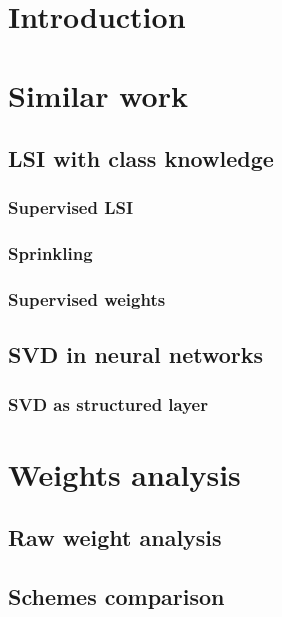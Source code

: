 \chapter*{Introduction}


{}


\chapter{Similar work}
    \section{LSI with class knowledge}
        \subsection{Supervised LSI}
            \cite{sun2004supervised} %

        \subsection{Sprinkling}
            \cite{chakraborti2007supervised} %
        
        \subsection{Supervised weights} \label{sec:supervised:weights}
            \cite{wu2017balancing} %
            \cite{ji2013discriminative} %
            \cite{deng2014study} %
            \cite{lan2009supervised} %

    
    \section{SVD in neural networks}
        \subsection{SVD as structured layer} 
            \cite{ionescu2015training} %

    
{}

        
{}



\chapter{Weights analysis}

    \section{Raw weight analysis}
    
    
    \section{Schemes comparison}
